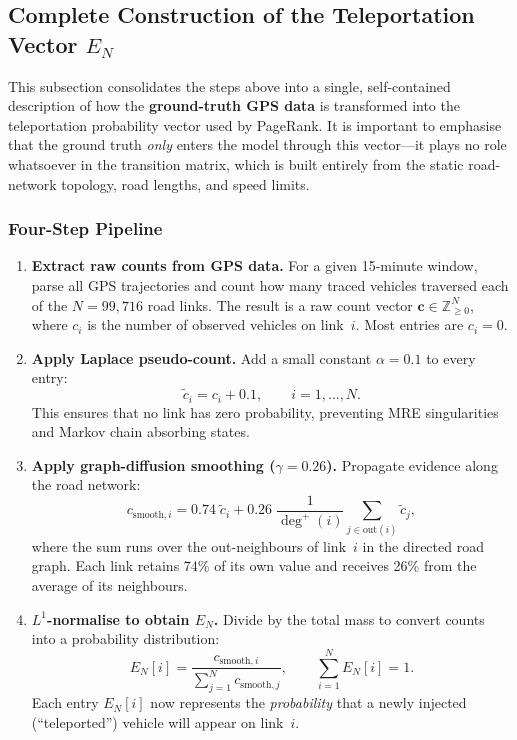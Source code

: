 \documentclass[12pt,a4paper]{article}
\theoremstyle{definition}
\theoremstyle{plain}
\begin{document}
\subsection{Complete Construction of the Teleportation Vector $E_N$}
\label{sec:teleportation_construction}

This subsection consolidates the steps above into a single, self-contained
description of how the \textbf{ground-truth GPS data} is transformed into the
teleportation probability vector used by PageRank. It is important to emphasise
that the ground truth \emph{only} enters the model through this vector---it plays
no role whatsoever in the transition matrix, which is built entirely from the
static road-network topology, road lengths, and speed limits.

\subsubsection{Four-Step Pipeline}

\begin{enumerate}[label=\textbf{Step~\arabic*.}]
  \item \textbf{Extract raw counts from GPS data.}
    For a given 15-minute window, parse all GPS trajectories and count how many
    traced vehicles traversed each of the $N = 99{,}716$ road links. The result is
    a raw count vector $\mathbf{c} \in \mathbb{Z}_{\geq 0}^N$, where $c_i$ is the
    number of observed vehicles on link~$i$. Most entries are $c_i = 0$.

  \item \textbf{Apply Laplace pseudo-count.}
    Add a small constant $\alpha = 0.1$ to every entry:
    \[
      \tilde{c}_i = c_i + 0.1, \qquad i = 1, \ldots, N.
    \]
    This ensures that no link has zero probability, preventing MRE singularities
    and Markov chain absorbing states.

  \item \textbf{Apply graph-diffusion smoothing ($\gamma = 0.26$).}
    Propagate evidence along the road network:
    \[
      c_{\text{smooth},i}
      = 0.74\;\tilde{c}_i
      + 0.26\;\frac{1}{\deg^{+}(i)}\sum_{j \in \text{out}(i)} \tilde{c}_j,
    \]
    where the sum runs over the out-neighbours of link~$i$ in the directed road
    graph. Each link retains 74\% of its own value and receives 26\% from the
    average of its neighbours.

  \item \textbf{$L^1$-normalise to obtain $E_N$.}
    Divide by the total mass to convert counts into a probability distribution:
    \[
      E_N[i] = \frac{c_{\text{smooth},i}}{\sum_{j=1}^N c_{\text{smooth},j}},
      \qquad \sum_{i=1}^N E_N[i] = 1.
    \]
    Each entry $E_N[i]$ now represents the \emph{probability} that a newly injected
    (``teleported'') vehicle will appear on link~$i$.
\end{enumerate}
\end{document}
